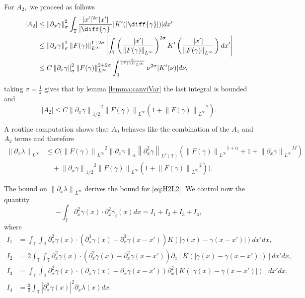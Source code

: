\documentclass[a4paper]{amsart}
\theoremstyle{definition}
\newcommand{\T}{\ensuremath{\mathbb{T}}}
\newcommand{\Na}[2][\gamma]{\ensuremath{\left\|#2\right\|_{#1}}}
\newcommand{\Np}[2][\infty]{\ensuremath{\left\|#2\right\|_{L^#1}}}
\newcommand{\Lp}[2][2]{\ensuremath{\left\|#2\right\|_{L^#1(\T)}}}
\newcommand{\intT}{\ensuremath{\int_\T}}
\begin{document}
    For $A_2,$ we proceed as follows
    \begin{align*}
        |A_2|&\leq \Na[\sigma]{\partial_x\gamma }^2 \intT \frac{|x'|^{2\sigma}|x'|}{|\diff{\gamma}|}| K'(|\diff{\gamma}|)|dx' \\ 
        &\leq \Na[\sigma]{\partial_x\gamma }^2 \Np{F(\gamma)}^{1+2\sigma} \left|\intT \left(\frac{|x'|}{\Np{F(\gamma)}}\right)^{2\sigma}K'\left(\frac{|x'|}{\Np{F(\gamma)}}\right) dx'\right|\\
        &\leq C\Na[\sigma]{\partial_x\gamma }^2 \Np{F(\gamma)}^{2+2\sigma} \int_0^{\frac{\pi}{\Np{F(\gamma)}}} \nu^{2\sigma} |K'(\nu)| d\nu ,
    \end{align*}

    taking $\sigma=\frac{1}{2}$ gives that by lemma \ref{lemma:canviVar} the last integral is bounded and 
    $$|A_2|\leq  C\Na[1/2]{\partial_x\gamma }^2 \Np{F(\gamma)}(1+\Np{F(\gamma)}^{2}).$$

    A routine computation shows that \(A_0\) behaves like the combination of the \(A_1\) and \(A_2\) terms and therefore 
    \begin{equation}
        \label{eq:controlDerivadaLambda}
        \begin{aligned}       
        \Np{\partial_x\lambda} &\leq C (\Np{F(\gamma)}^2 \Na[\alpha]{\partial_x\gamma}\Lp[p]{\partial_x^2 \gamma} (\Np{F(\gamma)}^{1+\alpha}+1+\Np{\partial_x\gamma}^M) \\&\quad+\Na[1/2]{\partial_x\gamma }^2 \Np{F(\gamma)}(1+\Np{F(\gamma)}^{2})).
         \end{aligned}
    \end{equation}

    The bound on $\Np{\partial_x \lambda}$ derives the bound for \eqref{eq:H2L2}. We control now the quantity $$-\int_\T \partial_x^2\gamma(x)\cdot\partial_x^2\gamma_t(x)dx= I_1+ I_2+ I_3+I_4,$$ where 
    \begin{align*}        I_1&=\int_\T\int_\T\partial_x^2\gamma(x)\cdot(\partial_x^3\gamma(x)-\partial_x^3\gamma(x-x'))K(|\gamma(x)-\gamma(x-x')|)dx'dx,\\         I_2&=2\int_\T\int_\T\partial_x^2\gamma(x)\cdot(\partial_x^2\gamma(x)-\partial_x^2\gamma(x-x'))\partial_x[K(|\gamma(x)-\gamma(x-x')|)]dx'dx,\\        I_3&=\int_\T\int_\T\partial_x^2\gamma(x)\cdot(\partial_x\gamma(x)-\partial_x\gamma(x-x'))\partial_x^2[K(|\gamma(x)-\gamma(x-x')|)]dx'dx,\\
        I_4&=\frac{3}{2}\intT |\partial_x^2\gamma(x)|^2\partial_x\lambda(x) dx .       
    \end{align*}
\end{document}
